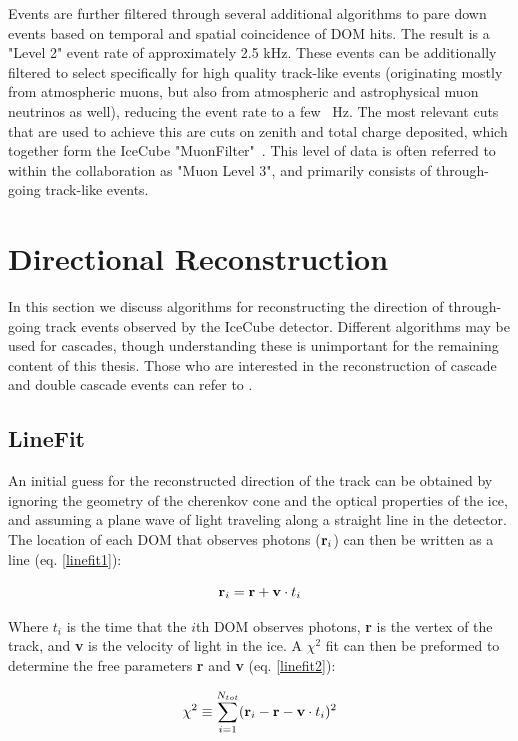 Events are further filtered through several additional algorithms to pare down events based on temporal and spatial coincidence of DOM hits. The result is a "Level 2" event rate of approximately 2.5 kHz. These events can be additionally filtered to select specifically for high quality track-like events (originating mostly from atmospheric muons, but also from atmospheric and astrophysical muon neutrinos as well), reducing the event rate to a few ~Hz. \color{red}The most relevant cuts that are used to achieve this are cuts on zenith and total charge deposited, which together form the IceCube "MuonFilter"~\cite{muonfilter_ref}\color{black}.  This level of data is often referred to within the collaboration as "Muon Level 3", and primarily consists of through-going track-like events. 

\section{Directional Reconstruction}
In this section we discuss algorithms for reconstructing the direction of through-going track events observed by the IceCube detector. Different algorithms may be used for cascades, though understanding these is unimportant for the remaining content of this thesis. Those who are interested in the reconstruction of cascade and double cascade events can refer to \cite{AustinThesis}.

\subsection{LineFit}
An initial guess for the reconstructed direction of the track can be obtained by ignoring the geometry of the cherenkov cone and the optical properties of the ice, and assuming a plane wave of light traveling along a straight line in the detector. The location of each DOM that observes photons ($\textbf r_i$) can then be written as a line (eq. \ref{linefit1}):

\begin{equation}
    \textbf r_i = \textbf r + \textbf v \cdot t_i
    \label{linefit1}
\end{equation}

Where $t_i$ is the time that the $i$th DOM observes photons, \textbf{r} is the vertex of the track, and \textbf{v} is the velocity of light in the ice. A $\chi^2$ fit can then be preformed to determine the free parameters \textbf{r} and \textbf{v} (eq. \ref{linefit2}):

\begin{equation}
    \chi^2 \equiv \sum_{i=1}^{N_{tot}}(\textbf r_i - \textbf r - \textbf v \cdot t_i)^2
    \label{linefit2}
\end{equation}

